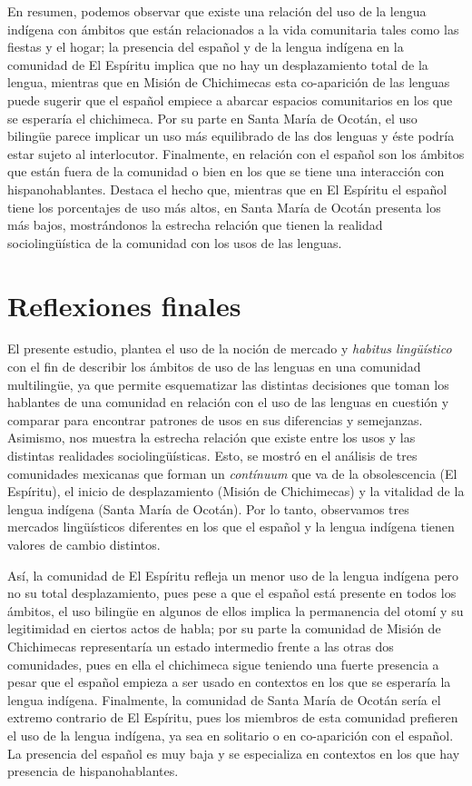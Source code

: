\documentclass[output=paper]{../langscibook}
\begin{document}
En resumen, podemos observar que existe una relación del uso de la lengua indígena con ámbitos que están relacionados a la vida comunitaria tales como las fiestas y el hogar; la presencia del español y de la lengua indígena en la comunidad de El Espíritu implica que no hay un desplazamiento total de la lengua, mientras que en Misión de Chichimecas esta co-aparición de las lenguas puede sugerir que el español empiece a abarcar espacios comunitarios en los que se esperaría el chichimeca. Por su parte en Santa María de Ocotán, el uso bilingüe parece implicar un uso más equilibrado de las dos lenguas y éste podría estar sujeto al interlocutor. Finalmente, en relación con el español son los ámbitos que están fuera de la comunidad o bien en los que se tiene una interacción con hispanohablantes. Destaca el hecho que, mientras que en El Espíritu el español tiene los porcentajes de uso más altos, en Santa María de Ocotán presenta los más bajos, mostrándonos la estrecha relación que tienen la realidad sociolingüística de la comunidad con los usos de las lenguas.


 \section{Reflexiones finales}


El presente estudio, plantea el uso de la noción de mercado y \textit{habitus lingüístico} con el fin de describir los ámbitos de uso de las lenguas en una comunidad multilingüe, ya que permite esquematizar las distintas decisiones que toman los hablantes de una comunidad en relación con el uso de las lenguas en cuestión y comparar para encontrar patrones de usos en sus diferencias y semejanzas. Asimismo, nos muestra la estrecha relación que existe entre los usos y las distintas realidades sociolingüísticas. Esto, se mostró en el análisis de tres comunidades mexicanas que forman un \textit{contínuum} que va de la obsolescencia (El Espíritu), el inicio de desplazamiento (Misión de Chichimecas) y la vitalidad de la lengua indígena (Santa María de Ocotán). Por lo tanto, observamos tres mercados lingüísticos diferentes en los que el español y la lengua indígena tienen valores de cambio distintos.

Así, la comunidad de El Espíritu refleja un menor uso de la lengua indígena pero no su total desplazamiento, pues pese a que el español está presente en todos los ámbitos, el uso bilingüe en algunos de ellos implica la permanencia del otomí y su legitimidad en ciertos actos de habla; por su parte la comunidad de Misión de Chichimecas representaría un estado intermedio frente a las otras dos comunidades, pues en ella el chichimeca sigue teniendo una fuerte presencia a pesar que el español empieza a ser usado en contextos en los que se esperaría la lengua indígena. Finalmente, la comunidad de Santa María de Ocotán sería el extremo contrario de El Espíritu, pues los miembros de esta comunidad prefieren el uso de la lengua indígena, ya sea en solitario o en co-aparición con el español. La presencia del español es muy baja y se especializa en contextos en los que hay presencia de hispanohablantes.
\end{document}
